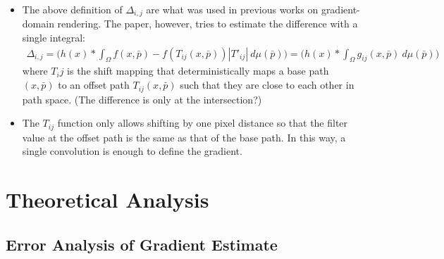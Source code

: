 \documentclass[10pt]{article}
\begin{document}
\begin{itemize}
  	\item The above definition of $\Delta_{i,j}$ are what was used in previous works on gradient-domain rendering.  The paper, however, tries to estimate the difference with a single integral:
  	\begin{align*}
  		\Delta_{i,j} 
  		= \bigg( h(x) * \int_{\Omega} f(x, \bar p) - f(T_{ij}(x, \bar p)) |T'_{ij}|\ d\mu(\bar p) \bigg)
  		= \bigg( h(x) * \int_{\Omega} g_{ij}(x, \bar p)\ d\mu(\bar p) \bigg)
  	\end{align*}
  	where $T_ij$ is the shift mapping that deterministically maps a base path $(x,\bar p)$ to an offset path $T_{ij}(x, \bar p)$ such that they are close to each other in path space.  (The difference is only at the intersection?)

  	\item The $T_{ij}$ function only allows shifting by one pixel distance so that the filter value at the offset path is the same as that of the base path.  In this way, a single convolution is enough to define the gradient.
  \end{itemize}

  \section{Theoretical Analysis}

  \subsection{Error Analysis of Gradient Estimate}
\end{document}
